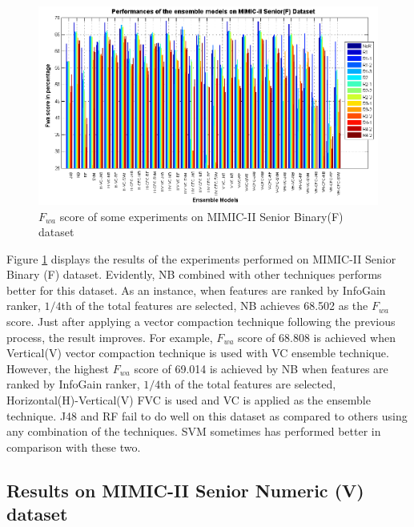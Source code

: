 \begin{figure}[h] 
	\centering 
	\includegraphics[scale=0.6]{fig/mimic2-seniork1f-full-table.png}
	\caption{$F_{wa}$ score of some experiments on MIMIC-II Senior Binary(F) dataset}
	\label{F:MIMIC2_SeniorK1F_Table}
\end{figure} 

Figure \ref{F:MIMIC2_SeniorK1F_Table} displays the results of the experiments performed on MIMIC-II Senior Binary (F) dataset. Evidently, NB combined with other techniques performs better for this dataset. As an instance, when features are ranked by InfoGain ranker, ${1/4}$th of the total features are selected, NB achieves 68.502 as the $F_{wa}$ score. Just after applying a vector compaction technique following the previous process, the result improves. For example, $F_{wa}$ score of 68.808 is achieved when Vertical(V) vector compaction technique is used with VC ensemble technique. However, the highest $F_{wa}$ score of 69.014 is achieved by NB when features are ranked by InfoGain ranker, ${1/4}$th of the total features are selected, Horizontal(H)-Vertical(V) FVC is used and VC is applied as the ensemble technique. J48 and RF fail to do well on this dataset as compared to others using any combination of the techniques. SVM sometimes has performed better in comparison with these two.    

\subsection{Results on MIMIC-II Senior Numeric (V) dataset}


